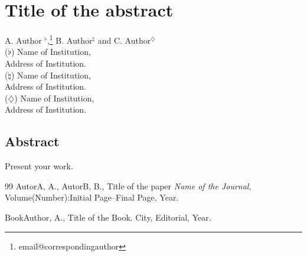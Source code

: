 \documentclass[a4paper,11pt]{book}
\begin{document}
	
\titleformat{\chapter}[frame]{\normalfont}{}{10pt}{\LARGE\bfseries\filcenter}

\chapter{Title of the abstract}
\thispagestyle{empty}
\vspace{-0.5cm}
\begin{center}
\begin{large}
		A. Author $^\flat$,\footnote{email@correspondingauthor}
		B. Author$^\natural$
		and C. Author$^\diamondsuit$\\
		\vspace{0.25cm}
		\normalsize ($\flat$)\; Name of Institution,\\
		\normalsize Address of Institution.\\ 
		\normalsize ($\natural$)\; Name of Institution,\\
		\normalsize Address of Institution. \\
		\normalsize ($\diamondsuit$)\; Name of Institution,\\
		\normalsize Address of Institution. \\
\end{large}
\end{center}
\vspace{-0.5cm}


\section*{Abstract}

Present your work. 



\begin{small}
	\begin{thebibliography}{99}
		AutorA, A., AutorB, B., Title of the paper
		{\em Name of the Journal}, Volume(Number):Initial Page--Final Page, Year.
		
		 BookAuthor, A., Title of the Book. City, Editorial, Year.
	\end{thebibliography}
\end{small}
\end{document}

